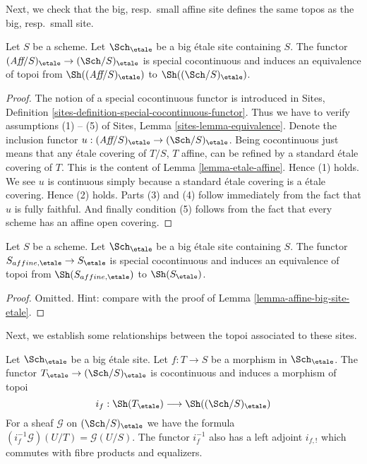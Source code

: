 \noindent
Next, we check that the big, resp.\ small affine site defines the same
topos as the big, resp.\ small site.

\begin{lemma}
\label{lemma-affine-big-site-etale}
Let $S$ be a scheme. Let $\Sch_\etale$ be a big \'etale
site containing $S$.
The functor
$(\textit{Aff}/S)_\etale \to (\Sch/S)_\etale$
is special cocontinuous and induces an equivalence of topoi from
$\Sh((\textit{Aff}/S)_\etale)$ to
$\Sh((\Sch/S)_\etale)$.
\end{lemma}

\begin{proof}
The notion of a special cocontinuous functor is introduced in
Sites, Definition \ref{sites-definition-special-cocontinuous-functor}.
Thus we have to verify assumptions (1) -- (5) of
Sites, Lemma \ref{sites-lemma-equivalence}.
Denote the inclusion functor
$u : (\textit{Aff}/S)_\etale \to (\Sch/S)_\etale$.
Being cocontinuous just means that any \'etale covering of
$T/S$, $T$ affine, can be refined by a standard \'etale covering of $T$.
This is the content of
Lemma \ref{lemma-etale-affine}.
Hence (1) holds. We see $u$ is continuous simply because a standard
\'etale covering is a \'etale covering. Hence (2) holds.
Parts (3) and (4) follow immediately from the fact that $u$ is
fully faithful. And finally condition (5) follows from the
fact that every scheme has an affine open covering.
\end{proof}

\begin{lemma}
\label{lemma-alternative}
Let $S$ be a scheme. Let $\Sch_\etale$ be a big \'etale
site containing $S$. The functor $S_{affine, \etale} \to S_\etale$
is special cocontinuous and induces an equivalence of topoi from
$\Sh(S_{affine, \etale})$ to $\Sh(S_\etale)$.
\end{lemma}

\begin{proof}
Omitted. Hint: compare with the proof of
Lemma \ref{lemma-affine-big-site-etale}.
\end{proof}

\noindent
Next, we establish some relationships between the topoi
associated to these sites.

\begin{lemma}
\label{lemma-put-in-T-etale}
Let $\Sch_\etale$ be a big \'etale site.
Let $f : T \to S$ be a morphism in $\Sch_\etale$.
The functor $T_\etale \to (\Sch/S)_\etale$
is cocontinuous and induces a morphism of topoi
$$
i_f :
\Sh(T_\etale)
\longrightarrow
\Sh((\Sch/S)_\etale)
$$
For a sheaf $\mathcal{G}$ on $(\Sch/S)_\etale$
we have the formula $(i_f^{-1}\mathcal{G})(U/T) = \mathcal{G}(U/S)$.
The functor $i_f^{-1}$ also has a left adjoint $i_{f, !}$ which commutes
with fibre products and equalizers.
\end{lemma}

